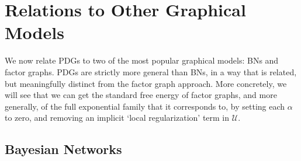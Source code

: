 \documentclass{article}
\theoremstyle{plain}
\theoremstyle{definition}
\theoremstyle{remark}
\numberwithin{equation}{section}
\begin{document}


	\section{Relations to Other Graphical
          Models}\label{sec:other-graphical-models}
	We now relate PDGs to two of the most popular graphical
        models: BNs and factor graphs. PDGs are strictly more general
        than BNs, in a way that is related, but meaningfully distinct
        from the factor graph approach. More concretely, we will see
        that we can get the standard free energy of factor graphs, and
        more generally, of the full exponential family that it
        corresponds to, by setting each $\alpha$ to zero, and removing
        an implicit  `local regularization' term in $\mathcal U$. 
		
	\subsection{Bayesian Networks} \label{sec:bn-convert}
		
\end{document}
